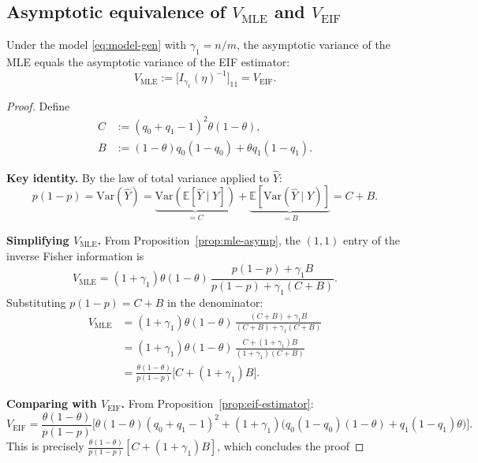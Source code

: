 \subsection{Asymptotic equivalence of $V_{\text{MLE}}$ and $V_{\text{EIF}}$}

  \begin{proposition}
  \label{prop:mle-eif-equivalence}
  Under the model \eqref{eq:model-gen} with $\gamma_1 = n/m$, the asymptotic variance of the MLE equals the asymptotic variance of the EIF estimator:
  \[
  V_{\mathrm{MLE}} := \bigl[I_{\gamma_1}(\eta)^{-1}\bigr]_{11} = V_{\mathrm{EIF}}.
  \]
  \end{proposition}

  \begin{proof}
  Define
  \begin{align*}
  C &:= (q_0+q_1-1)^2\theta(1-\theta), \\
  B &:= (1-\theta)q_0(1-q_0) + \theta q_1(1-q_1).
  \end{align*}

  \textbf{Key identity.} By the law of total variance applied to $\hat Y$:
  \[
  p(1-p) = \mathrm{Var}(\hat Y) = \underbrace{\mathrm{Var}(\mathbb{E}[\hat Y \mid Y])}_{= C} + \underbrace{\mathbb{E}[\mathrm{Var}(\hat Y \mid Y)]}_{= B} = C + B.
  \]

  \textbf{Simplifying $V_{\mathrm{MLE}}$.} From Proposition~\ref{prop:mle-asymp}, the $(1,1)$ entry of the inverse Fisher information is
  \[
  V_{\mathrm{MLE}} = (1+\gamma_1)\theta(1-\theta)\,\frac{p(1-p) + \gamma_1 B}{p(1-p) + \gamma_1(C + B)}.
  \]
  Substituting $p(1-p) = C + B$ in the denominator:
  \begin{align*}
  V_{\mathrm{MLE}} &= (1+\gamma_1)\theta(1-\theta)\,\frac{(C+B) + \gamma_1 B}{(C+B) + \gamma_1(C+B)} \\[4pt]
  &= (1+\gamma_1)\theta(1-\theta)\,\frac{C + (1+\gamma_1)B}{(1+\gamma_1)(C+B)} \\[4pt]
  &= \frac{\theta(1-\theta)}{p(1-p)}\bigl[C + (1+\gamma_1)B\bigr].
  \end{align*}

  \textbf{Comparing with $V_{\mathrm{EIF}}$.} From Proposition~\ref{prop:eif-estimator}:
  \[
  V_{\mathrm{EIF}} = \frac{\theta(1-\theta)}{p(1-p)}\bigl[\theta(1-\theta)(q_0+q_1-1)^2 + (1+\gamma_1)\bigl(q_0(1-q_0)(1-\theta) + q_1(1-q_1)\theta\bigr)\bigr].
  \]
  This is precisely $\frac{\theta(1-\theta)}{p(1-p)}[C + (1+\gamma_1)B]$, which concludes the proof
  \end{proof}


